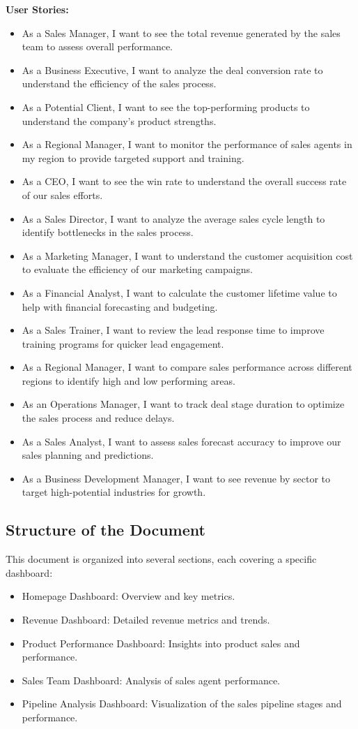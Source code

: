 \documentclass{article}
\begin{document}
\noindent \textbf{User Stories:}
\begin{itemize}
    \item As a Sales Manager, I want to see the total revenue generated by the sales team to assess overall performance.
    \item As a Business Executive, I want to analyze the deal conversion rate to understand the efficiency of the sales process.
    \item As a Potential Client, I want to see the top-performing products to understand the company’s product strengths.
    \item As a Regional Manager, I want to monitor the performance of sales agents in my region to provide targeted support and training.
    \item As a CEO, I want to see the win rate to understand the overall success rate of our sales efforts.
    \item As a Sales Director, I want to analyze the average sales cycle length to identify bottlenecks in the sales process.
    \item As a Marketing Manager, I want to understand the customer acquisition cost to evaluate the efficiency of our marketing campaigns.
    \item As a Financial Analyst, I want to calculate the customer lifetime value to help with financial forecasting and budgeting.
    \item As a Sales Trainer, I want to review the lead response time to improve training programs for quicker lead engagement.
    \item As a Regional Manager, I want to compare sales performance across different regions to identify high and low performing areas.
    \item As an Operations Manager, I want to track deal stage duration to optimize the sales process and reduce delays.
    \item As a Sales Analyst, I want to assess sales forecast accuracy to improve our sales planning and predictions.
    \item As a Business Development Manager, I want to see revenue by sector to target high-potential industries for growth.
\end{itemize}


\subsection{Structure of the Document}
This document is organized into several sections, each covering a specific dashboard:
\begin{itemize}
    \item Homepage Dashboard: Overview and key metrics.
    \item Revenue Dashboard: Detailed revenue metrics and trends.
    \item Product Performance Dashboard: Insights into product sales and performance.
    \item Sales Team Dashboard: Analysis of sales agent performance.
    \item Pipeline Analysis Dashboard: Visualization of the sales pipeline stages and performance.
\end{itemize}
\clearpage
\end{document}
